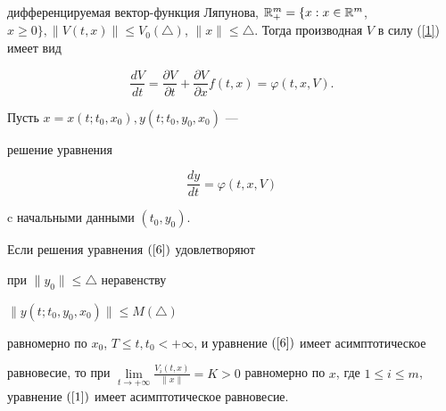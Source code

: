 дифференцируемая вектор-функция Ляпунова, $\R_{+}^{m}=\lbrace x:


x\in \R^{m}$, $x\geq 0 \rbrace,


\|V(t,x)\|\leq V_{0}(\triangle)$, $\|x\| \leq


\triangle$. Тогда производная $V$ в силу (\ref{1}) имеет вид


$$


\frac{dV}{dt}=\frac{\partial V}{\partial t}+


\frac{\partial V}{\partial x}f(t,x) = \varphi(t,x,V).


$$


Пусть $x=x(t;t_{0},x_{0}), y(t;t_{0},y_{0},x_{0})$ ---


решение уравнения 


\begin{equation}


\label{6}


\frac{dy}{dt}=\varphi(t,x,V)


\end{equation}


c начальными данными $(t_{0},y_{0})$.





\begin{thm}\label{T_8}


Если решения уравнения $(\ref{6})$ удовлетворяют


при $\|y_{0}\|\leq \triangle$ неравенству\linebreak


$\|y(t;t_{0},y_{0},x_{0})\|\leq M(\triangle)$


равномерно по $x_{0}$, $T\leq t,


t_{0}<+\infty$, и уравнение $(\ref{6})$ имеет асимптотическое


равновесие, то при $\lim\limits_{t\rightarrow +\infty


}\frac{V_{i}(t,x)}{\|x\|}=K>0$ равномерно по $x$, где $1\leq i \leq


m$, уравнение $(\ref{1})$ имеет асимптотическое равновесие.


\end{thm}





